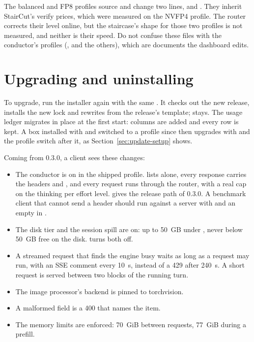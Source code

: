 The balanced and FP8 profiles source  and change two lines,  and . They inherit StairCut's verify prices, which were measured on the NVFP4 profile. The router corrects their level online, but the staircase's shape for those two profiles is not measured, and neither is their speed. Do not confuse these files with the conductor's profiles (,  and the others), which are documents the dashboard edits.

\section{Upgrading and uninstalling}

To upgrade, run the installer again with the same . It checks out the new release, installs the new lock and rewrites  from the release's template;  stays. The usage ledger migrates in place at the first start: columns are added and every row is kept. A box installed with  and switched to a profile since then upgrades with  and the profile switch after it, as Section~\ref{sec:update-setup} shows.

Coming from 0.3.0, a client sees these changes:

\begin{itemize}
\item The conductor is on in the shipped profile.  lists  alone, every response carries the headers  and , and every request runs through the router, with a real cap on the thinking per effort level.  gives the release path of 0.3.0. A benchmark client that cannot send a header should run against a server with  and an empty  in .
\item The disk tier and the session spill are on: up to 50~GB under , never below 50~GB free on the disk.  turns both off.
\item A streamed request that finds the engine busy waits as long as a request may run, with an SSE comment every 10~s, instead of a 429 after 240~s. A short request is served between two blocks of the running turn.
\item The image processor's backend is pinned to torchvision.
\item A malformed  field is a 400 that names the item.
\item The memory limits are enforced: 70~GiB between requests, 77~GiB during a prefill.
\end{itemize}

